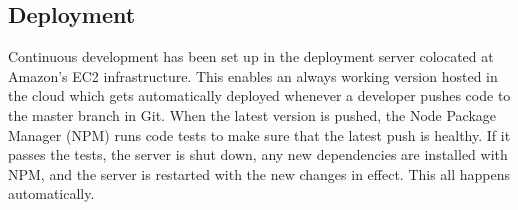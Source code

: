 


\subsection{Deployment}

Continuous development has been set up in the deployment server colocated at
Amazon's EC2 infrastructure. This enables an always working version hosted in
the cloud which gets automatically deployed whenever a developer pushes code to
the master branch in Git. When the latest version is pushed, the Node Package
Manager (NPM) runs code tests to make sure that the latest push is healthy. If
it passes the tests, the server is shut down, any new dependencies are installed
with NPM, and the server is restarted with the new changes in effect. This all
happens automatically.









